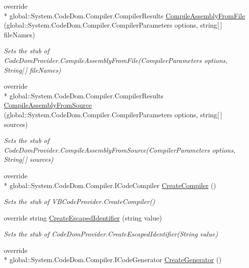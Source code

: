 \begin{DoxyCompactItemize}
override \\*
global\-::\-System.\-Code\-Dom.\-Compiler.\-Compiler\-Results \hyperlink{class_microsoft_1_1_visual_basic_1_1_fakes_1_1_stub_v_b_code_provider_a73cb153ada5d78f25f5080c11a4657e5}{Compile\-Assembly\-From\-File} (global\-::\-System.\-Code\-Dom.\-Compiler.\-Compiler\-Parameters options, string\mbox{[}$\,$\mbox{]} file\-Names)
\begin{DoxyCompactList}\small\item\em Sets the stub of Code\-Dom\-Provider.\-Compile\-Assembly\-From\-File(\-Compiler\-Parameters options, String\mbox{[}$\,$\mbox{]} file\-Names)\end{DoxyCompactList}\item 
override \\*
global\-::\-System.\-Code\-Dom.\-Compiler.\-Compiler\-Results \hyperlink{class_microsoft_1_1_visual_basic_1_1_fakes_1_1_stub_v_b_code_provider_ad05d057d73d21649dbd71a8490a428bf}{Compile\-Assembly\-From\-Source} (global\-::\-System.\-Code\-Dom.\-Compiler.\-Compiler\-Parameters options, string\mbox{[}$\,$\mbox{]} sources)
\begin{DoxyCompactList}\small\item\em Sets the stub of Code\-Dom\-Provider.\-Compile\-Assembly\-From\-Source(\-Compiler\-Parameters options, String\mbox{[}$\,$\mbox{]} sources)\end{DoxyCompactList}\item 
override \\*
global\-::\-System.\-Code\-Dom.\-Compiler.\-I\-Code\-Compiler \hyperlink{class_microsoft_1_1_visual_basic_1_1_fakes_1_1_stub_v_b_code_provider_a28c9ba287a272df3f285e728d49346fd}{Create\-Compiler} ()
\begin{DoxyCompactList}\small\item\em Sets the stub of V\-B\-Code\-Provider.\-Create\-Compiler()\end{DoxyCompactList}\item 
override string \hyperlink{class_microsoft_1_1_visual_basic_1_1_fakes_1_1_stub_v_b_code_provider_ae4b0a6429116b4e24f5e856f5afe3654}{Create\-Escaped\-Identifier} (string value)
\begin{DoxyCompactList}\small\item\em Sets the stub of Code\-Dom\-Provider.\-Create\-Escaped\-Identifier(\-String value)\end{DoxyCompactList}\item 
override \\*
global\-::\-System.\-Code\-Dom.\-Compiler.\-I\-Code\-Generator \hyperlink{class_microsoft_1_1_visual_basic_1_1_fakes_1_1_stub_v_b_code_provider_a12c518873c1489c09005a6e879ac6800}{Create\-Generator} ()

\end{DoxyCompactItemize}
